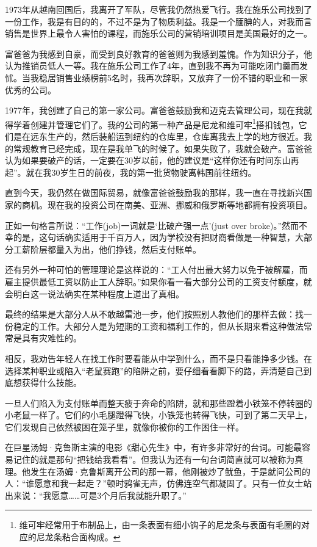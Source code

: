 1973年从越南回国后，我离开了军队，尽管我仍然热爱飞行。我在施乐公司找到了一份工作，我是有目的的，不过不是为了物质利益。我是一个腼腆的人，对我而言销售是世界上最令人害怕的课程，而施乐公司的营销培训项目是美国最好的之一。

富爸爸为我感到自豪，而受到良好教育的爸爸则为我感到羞愧。作为知识分子，他认为推销员低人一等。我在施乐公司工作了4年，直到我不再为可能吃闭门羹而发怵。当我稳居销售业绩榜前5名时，我再次辞职，又放弃了一份不错的职业和一家优秀的公司。

1977年，我创建了自己的第一家公司。富爸爸鼓励我和迈克去管理公司，现在我就得学着创建并管理它们了。我的公司的第一种产品是尼龙和维可牢\footnote{维可牢经常用于布制品上，由一条表面有细小钩子的尼龙条与表面有毛圈的对应的尼龙条粘合面构成。}搭扣钱包，它们是在远东生产的，然后装船运到纽约的仓库里，仓库离我去上学的地方很近。我的常规教育已经完成，现在是我单飞的时候了。如果失败了，我就会破产。富爸爸认为如果要破产的话，一定要在30岁以前，他的建议是“这样你还有时间东山再起”。就在我30岁生日的前夜，我的第一批货物驶离韩国前往纽约。

直到今天，我仍然在做国际贸易，就像富爸爸鼓励我的那样，我一直在寻找新兴国家的商机。现在我的投资公司在南美、亚洲、挪威和俄罗斯等地都拥有投资项目。

正如一句格言所说：“工作(job)一词就是‘比破产强一点’(just over broke)。”然而不幸的是，这句话确实适用于千百万人，因为学校没有把财商看做是一种智慧，大部分工薪阶层都量入为出，他们挣钱，然后支付账单。

还有另外一种可怕的管理理论是这样说的：“工人付出最大努力以免于被解雇，而雇主提供最低工资以防止工人辞职。”如果你看一看大部分公司的工资支付额度，就会明白这一说法确实在某种程度上道出了真相。

最终的结果是大部分人从不敢越雷池一步，他们按照别人教他们的那样去做：找一份稳定的工作。大部分人是为短期的工资和福利工作的，但从长期来看这种做法常常是具有灾难性的。

相反，我劝告年轻人在找工作时要看能从中学到什么，而不是只看能挣多少钱。在选择某种职业或陷入“老鼠赛跑”的陷阱之前，要仔细看看脚下的路，弄清楚自己到底想获得什么技能。

一旦人们陷入为支付账单而整天疲于奔命的陷阱，就和那些蹬着小铁笼不停转圈的小老鼠一样了。它们的小毛腿蹬得飞快，小铁笼也转得飞快，可到了第二天早上，它们发现自己依然被困在笼子里，就像你被你的工作困住一样。

在巨星汤姆·克鲁斯主演的电影《甜心先生》中，有许多非常好的台词。可能最容易记住的就是那句“把钱给我看看”。但我认为还有一句台词简直就可以被称为真理。他发生在汤姆·克鲁斯离开公司的那一幕，他刚被炒了鱿鱼，于是就问公司的人：“谁愿意和我一起走？”顿时鸦雀无声，仿佛连空气都凝固了。只有一位女士站出来说：“我愿意……可是3个月后我就能升职了。”


